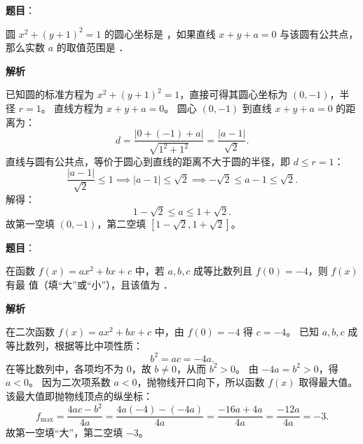 \begin{answer}

\textbf{题目}：

圆 $x^2+(y+1)^2=1$ 的圆心坐标是 \underline{\hspace{3em}}，如果直线 $x+y+a=0$ 与该圆有公共点，那么实数 $a$ 的取值范围是 \underline{\hspace{3em}}．

\textbf{解析}

已知圆的标准方程为 $x^2+(y+1)^2=1$，直接可得其圆心坐标为 $(0, -1)$，半径 $r=1$。
直线方程为 $x+y+a=0$。
圆心 $(0, -1)$ 到直线 $x+y+a=0$ 的距离为：
\nopagebreak[4]
\[
d=\frac{|0+(-1)+a|}{\sqrt{1^2+1^2}}=\frac{|a-1|}{\sqrt{2}}.
\]
直线与圆有公共点，等价于圆心到直线的距离不大于圆的半径，即 $d\le r=1$：
\nopagebreak[4]
\[
\frac{|a-1|}{\sqrt{2}}\le 1\implies |a-1|\le\sqrt{2}\implies -\sqrt{2}\le a-1\le\sqrt{2}.
\]
解得：
\nopagebreak[4]
\[
1-\sqrt{2}\le a\le 1+\sqrt{2}.
\]
故第一空填 $(0, -1)$，第二空填 $[1-\sqrt{2}, 1+\sqrt{2}]$。


\end{answer}
\begin{answer}

\textbf{题目}：

在函数 $f(x)=ax^2+bx+c$ 中，若 $a, b, c$ 成等比数列且 $f(0)=-4$，则 $f(x)$ 有最 \underline{\hspace{2em}} 值（填“大”或“小”），且该值为 \underline{\hspace{3em}}．

\textbf{解析}

在二次函数 $f(x)=ax^2+bx+c$ 中，由 $f(0)=-4$ 得 $c=-4$。
已知 $a, b, c$ 成等比数列，根据等比中项性质：
\nopagebreak[4]
\[
b^2=ac=-4a.
\]
在等比数列中，各项均不为 0，故 $b\neq 0$，从而 $b^2>0$。
由 $-4a=b^2>0$，得 $a<0$。
因为二次项系数 $a<0$，抛物线开口向下，所以函数 $f(x)$ 取得最大值。
该最大值即抛物线顶点的纵坐标：
\nopagebreak[4]
\[
f_{\max}=\frac{4ac-b^2}{4a}=\frac{4a(-4)-(-4a)}{4a}=\frac{-16a+4a}{4a}=\frac{-12a}{4a}=-3.
\]
故第一空填“大”，第二空填 $-3$。


\end{answer}
